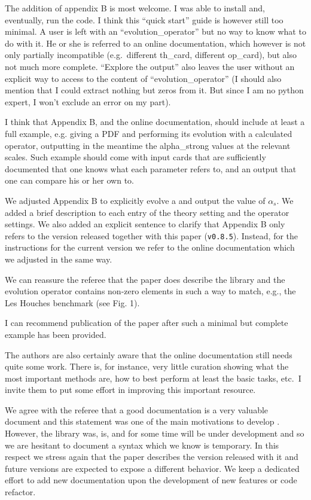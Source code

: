 \documentclass[a4paper,11pt]{article}
\begin{document}
\begin{response}{
  The addition of appendix B is most welcome. I was able to install and,
  eventually, run the code. I think this \enquote{quick start} guide is however still too
  minimal. A user is left with an \enquote{evolution\_operator} but no way to know what to
  do with it. He or she is referred to an online documentation, which however is
  not only partially incompatible (e.g.\ different th\_card, different op\_card), but
  also not much more complete. \enquote{Explore the output} also leaves the user without
  an explicit way to access to the content of \enquote{evolution\_operator} (I should
  also mention that I could extract nothing but zeros from it. But since I am no
  python expert, I won't exclude an error on my part).
  
  I think that Appendix B, and the online documentation, should include at least a
  full example, e.g. giving a PDF and performing its evolution with a calculated
  operator, outputting in the meantime the alpha\_strong values at the relevant
  scales. Such example should come with input cards that are sufficiently
  documented that one knows what each parameter refers to, and an output that one
  can compare his or her own to.
}
We adjusted Appendix B to explicitly evolve a \pdf{} and output the value of $\alpha_s$.
We added a brief description to each entry of the theory setting and the operator settings.
We also added an explicit sentence to clarify that Appendix B only refers to the version released
together with this paper (\texttt{v0.8.5}).
Instead, for the instructions for the current version we refer to the online documentation which we adjusted in the same way.

We can reassure the referee that the paper does describe the \eko{} library and the evolution
operator contains non-zero elements in such a way to match, e.g., the Les Houches benchmark (see Fig. 1).
\end{response}

\begin{response}{
  I can recommend publication of the paper after such a minimal but complete
  example has been provided.
  
  The authors are also certainly aware that the online documentation still needs
  quite some work. There is, for instance, very little curation showing what the
  most  important methods are, how to best perform at least the basic tasks, etc.\
  I invite them to put some effort in improving this important resource.
}
We agree with the referee that a good documentation is a very valuable document and this statement was one of the main motivations
to develop \eko{}. However, the library was, is, and for some time will be under development and so we are hesitant to document
a syntax which we know is temporary. In this respect we stress again that the paper describes the version released with it
and future versions are expected to expose a different behavior.
We keep a dedicated effort to add new documentation upon the development of new features or code refactor.
\end{response}

% 
% 

\end{document}
